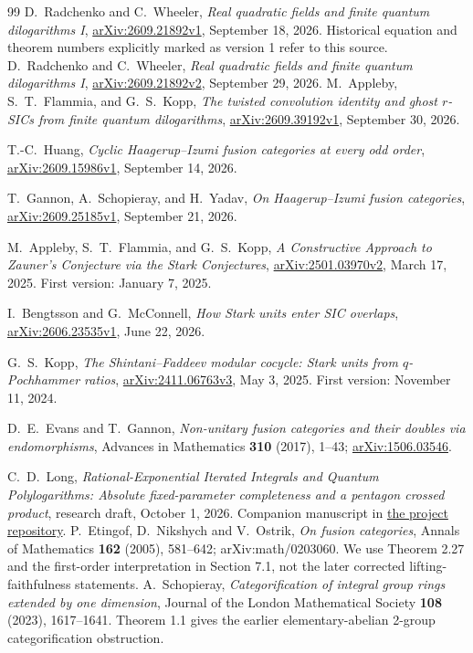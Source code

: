 \documentclass[11pt]{article}
\theoremstyle{remark}
\begin{document}
\begingroup
\small
\begin{thebibliography}{99}
\setlength{\itemsep}{2pt}
D.~Radchenko and C.~Wheeler,
\emph{Real quadratic fields and finite quantum dilogarithms I},
\href{https://arxiv.org/abs/2609.21892v1}{arXiv:2609.21892v1}, September 18, 2026.
Historical equation and theorem numbers explicitly marked as version 1 refer to this source.
D.~Radchenko and C.~Wheeler,
\emph{Real quadratic fields and finite quantum dilogarithms I},
\href{https://arxiv.org/abs/2609.21892v2}{arXiv:2609.21892v2}, September 29, 2026.
M.~Appleby, S.~T.~Flammia, and G.~S.~Kopp,
\emph{The twisted convolution identity and ghost $r$-SICs from finite quantum dilogarithms},
\href{https://arxiv.org/abs/2609.39192v1}{arXiv:2609.39192v1}, September 30, 2026.

T.-C.~Huang,
\emph{Cyclic Haagerup--Izumi fusion categories at every odd order},
\href{https://arxiv.org/abs/2609.15986v1}{arXiv:2609.15986v1}, September 14, 2026.

T.~Gannon, A.~Schopieray, and H.~Yadav,
\emph{On Haagerup--Izumi fusion categories},
\href{https://arxiv.org/abs/2609.25185v1}{arXiv:2609.25185v1}, September 21, 2026.

M.~Appleby, S.~T.~Flammia, and G.~S.~Kopp,
\emph{A Constructive Approach to Zauner's Conjecture via the Stark Conjectures},
\href{https://arxiv.org/abs/2501.03970v2}{arXiv:2501.03970v2}, March 17, 2025.
First version: January 7, 2025.

I.~Bengtsson and G.~McConnell,
\emph{How Stark units enter SIC overlaps},
\href{https://arxiv.org/abs/2606.23535v1}{arXiv:2606.23535v1}, June 22, 2026.

G.~S.~Kopp,
\emph{The Shintani--Faddeev modular cocycle: Stark units from $q$-Pochhammer ratios},
\href{https://arxiv.org/abs/2411.06763v3}{arXiv:2411.06763v3}, May 3, 2025.
First version: November 11, 2024.

D.~E.~Evans and T.~Gannon,
\emph{Non-unitary fusion categories and their doubles via endomorphisms},
Advances in Mathematics \textbf{310} (2017), 1--43;
\href{https://arxiv.org/abs/1506.03546}{arXiv:1506.03546}.

C.~D.~Long,
\emph{Rational-Exponential Iterated Integrals and Quantum Polylogarithms:
Absolute fixed-parameter completeness and a pentagon crossed product},
research draft, October 1, 2026.
Companion manuscript in
\href{https://github.com/long-mathematics/quantum-polylogarithms-finite-dilogarithms}{the project repository}.
P.~Etingof, D.~Nikshych and V.~Ostrik,
\emph{On fusion categories}, Annals of Mathematics \textbf{162} (2005),
581--642; arXiv:math/0203060. We use Theorem 2.27 and the first-order
interpretation in Section 7.1, not the later corrected lifting-faithfulness
statements.
A.~Schopieray,
\emph{Categorification of integral group rings extended by one dimension},
Journal of the London Mathematical Society \textbf{108} (2023), 1617--1641.
Theorem 1.1 gives the earlier elementary-abelian 2-group categorification
obstruction.
\end{thebibliography}
\endgroup
\end{document}
